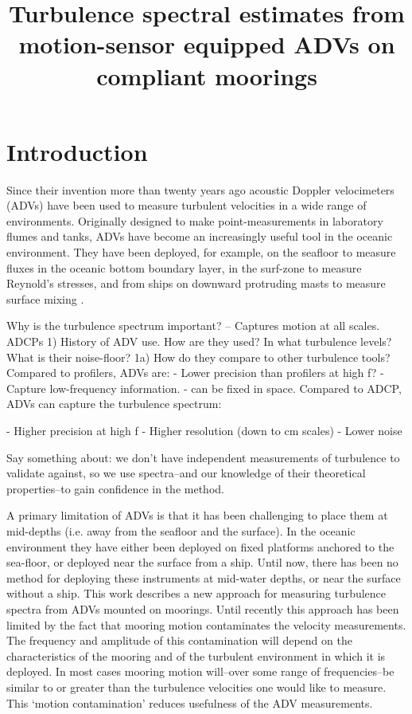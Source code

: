 \documentclass[twocol]{ametsoc}
\title{Turbulence spectral estimates from motion-sensor equipped ADVs on compliant moorings}
\affiliation{}
\begin{document}
\maketitle


\section{Introduction}


Since their invention more than twenty years ago acoustic Doppler velocimeters (ADVs) have been used to measure turbulent velocities in a wide range of environments. Originally designed to make point-measurements in laboratory flumes and tanks, ADVs have become an increasingly useful tool in the oceanic environment. They have been deployed, for example, on the seafloor to measure fluxes in the oceanic bottom boundary layer, in the surf-zone to measure Reynold's stresses, and from ships on downward protruding masts to measure surface mixing \citep[e.g.]{Lohrmann++1994, Voulgaris+Trowbridge1998, Kim++2000, Trowbridge+Elgar2003, Elgar++2005, Geyer++2008}.

Why is the turbulence spectrum important? -- Captures motion at all scales.
ADCPs 
1) History of ADV use. How are they used? In what turbulence levels? What is their noise-floor? 
1a) How do they compare to other turbulence tools?
Compared to profilers, ADVs are:
  - Lower precision than profilers at high f?
  - Capture low-frequency information.
  - can be fixed in space.
Compared to ADCP, ADVs can capture the turbulence spectrum:

  - Higher precision at high f
  - Higher resolution (down to cm scales)
  - Lower noise

Say something about: we don't have independent measurements of turbulence to validate against, so we use spectra--and our knowledge of their theoretical properties--to gain confidence in the method.

A primary limitation of ADVs is that it has been challenging to place them at mid-depths (i.e. away from the seafloor and the surface). In the oceanic environment they have either been deployed on fixed platforms anchored to the sea-floor, or deployed near the surface from a ship.  Until now, there has been no method for deploying these instruments at mid-water depths, or near the surface without a ship.  This work describes a new approach for measuring turbulence spectra from ADVs mounted on moorings. Until recently this approach has been limited by the fact that mooring motion contaminates the velocity measurements.  The frequency and amplitude of this contamination will depend on the characteristics of the mooring and of the turbulent environment in which it is deployed. In most cases mooring motion will--over some range of frequencies--be similar to or greater than the turbulence velocities one would like to measure. This `motion contamination' reduces usefulness of the ADV measurements. 
\end{document}
